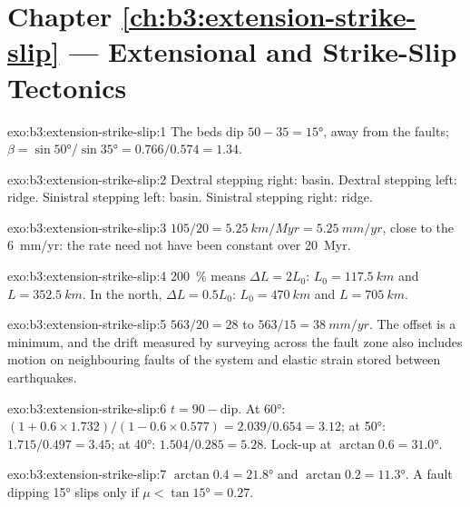\section*{Chapter \ref{ch:b3:extension-strike-slip} --- Extensional and Strike-Slip Tectonics}

\begin{solution}{exo:b3:extension-strike-slip:1}
The beds dip $50 - 35 = \ang{15}$, away from the faults; $\beta =
\sin\ang{50}/\sin\ang{35} = 0.766/0.574 = 1.34$.
\end{solution}

\begin{solution}{exo:b3:extension-strike-slip:2}
Dextral stepping right: basin. Dextral stepping left: ridge. Sinistral
stepping left: basin. Sinistral stepping right: ridge.
\end{solution}

\begin{solution}{exo:b3:extension-strike-slip:3}
$105/20 = \qty{5.25}{km/Myr} = \qty{5.25}{mm/yr}$, close to the
\qty{6}{mm/yr}: the rate need not have been constant over \qty{20}{Myr}.
\end{solution}

\begin{solution}{exo:b3:extension-strike-slip:4}
\qty{200}{\percent} means $\Delta L = 2L_0$: $L_0 = \qty{117.5}{km}$ and $L
= \qty{352.5}{km}$. In the north, $\Delta L = 0.5L_0$: $L_0 = \qty{470}{km}$
and $L = \qty{705}{km}$.
\end{solution}

\begin{solution}{exo:b3:extension-strike-slip:5}
$563/20 = 28$ to $563/15 = \qty{38}{mm/yr}$. The offset is a minimum, and
the drift measured by surveying across the fault zone also includes motion on
neighbouring faults of the system and elastic strain stored between
earthquakes.
\end{solution}

\begin{solution}{exo:b3:extension-strike-slip:6}
$t = 90 - \text{dip}$. At \ang{60}: $(1 + 0.6\times1.732)/(1 - 0.6\times
0.577) = 2.039/0.654 = 3.12$; at \ang{50}: $1.715/0.497 = 3.45$; at
\ang{40}: $1.504/0.285 = 5.28$. Lock-up at $\arctan0.6 = \ang{31.0}$.
\end{solution}

\begin{solution}{exo:b3:extension-strike-slip:7}
$\arctan0.4 = \ang{21.8}$ and $\arctan0.2 = \ang{11.3}$. A fault dipping
\ang{15} slips only if $\mu < \tan\ang{15} = 0.27$.
\end{solution}

